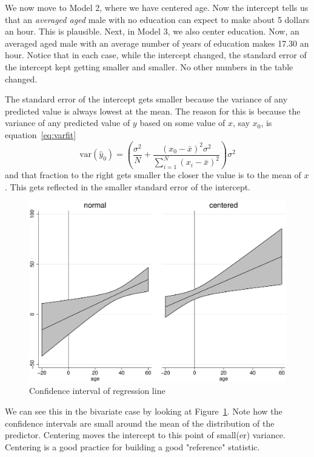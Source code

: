 We now move to Model 2, where we have centered age. Now the intercept tells us that an {\it averaged aged} male with no education can expect to make about 5 dollars an hour. This is plausible. Next, in Model 3, we also center education. Now, an averaged aged male with an average number of years of education makes 17.30 an hour. Notice that in each case, while the intercept changed, the standard error of the intercept kept getting smaller and smaller. No other numbers in the table changed.

The standard error of the intercept gets smaller because the variance of any predicted value is always lowest at the mean. The reason for this is because the variance of any predicted value of $y$ based on some value of $x$, say $x_0$, is equation~\eqref{eq:varfit}
\[
\mbox{var}\left(\hat{y}_0\right)=\left(\frac{\sigma^2}{N}+\frac{\left(x_0-\bar{x}\right)^2\sigma^2}{\sum_{i=1}^N\left(x_i-\bar{x}\right)^2}\right)\sigma^2
\]
and that fraction to the right gets smaller the closer the value is to the mean of $x$. This gets reflected in the smaller standard error of the intercept.
\begin{figure}
   \centering
   \includegraphics[angle=0,
           width=.75\textwidth]{centering_fitci.eps}
   \caption{Confidence interval of regression line}
  \label{fig:centering_fitci}
\end{figure}
We can see this in the bivariate case by looking at Figure~\ref{fig:centering_fitci}. Note how the confidence intervals are small around the mean of the distribution of the predictor. Centering moves the intercept to this point of small(er) variance. Centering is a good practice for building a good "reference" statistic.

